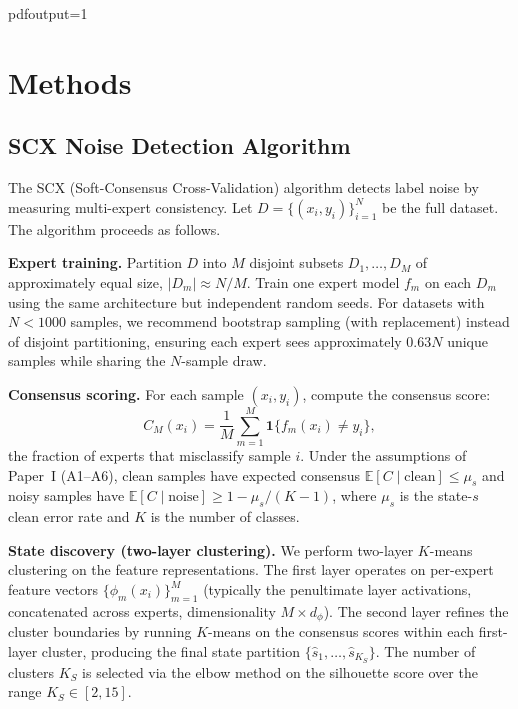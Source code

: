pdfoutput=1

\section{Methods}

\subsection{SCX Noise Detection Algorithm}

The SCX (Soft-Consensus Cross-Validation) algorithm detects label noise by measuring multi-expert consistency. Let $D = \{(x_i, y_i)\}_{i=1}^N$ be the full dataset. The algorithm proceeds as follows.

\textbf{Expert training.} Partition $D$ into $M$ disjoint subsets $D_1, \dots, D_M$ of approximately equal size, $|D_m| \approx N/M$. Train one expert model $f_m$ on each $D_m$ using the same architecture but independent random seeds. For datasets with $N < 1000$ samples, we recommend bootstrap sampling (with replacement) instead of disjoint partitioning, ensuring each expert sees approximately $0.63N$ unique samples while sharing the $N$-sample draw.

\textbf{Consensus scoring.} For each sample $(x_i, y_i)$, compute the consensus score:
\begin{equation}
C_M(x_i) = \frac{1}{M} \sum_{m=1}^M \mathbf{1}\{f_m(x_i) \neq y_i\},
\end{equation}
the fraction of experts that misclassify sample $i$. Under the assumptions of Paper~I (A1--A6), clean samples have expected consensus $\mathbb{E}[C \mid \text{clean}] \leq \mu_s$ and noisy samples have $\mathbb{E}[C \mid \text{noise}] \geq 1 - \mu_s/(K-1)$, where $\mu_s$ is the state-$s$ clean error rate and $K$ is the number of classes.

\textbf{State discovery (two-layer clustering).} We perform two-layer $K$-means clustering on the feature representations. The first layer operates on per-expert feature vectors $\{\phi_m(x_i)\}_{m=1}^M$ (typically the penultimate layer activations, concatenated across experts, dimensionality $M \times d_\phi$). The second layer refines the cluster boundaries by running $K$-means on the consensus scores within each first-layer cluster, producing the final state partition $\{\hat{s}_1, \dots, \hat{s}_{K_S}\}$. The number of clusters $K_S$ is selected via the elbow method on the silhouette score over the range $K_S \in [2, 15]$.

